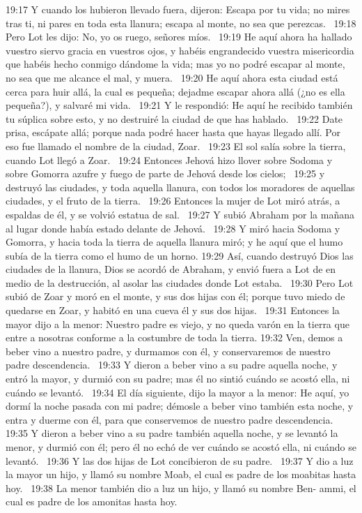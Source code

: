 19:17 Y cuando los hubieron llevado fuera, dijeron: Escapa por tu vida; no mires tras ti, ni pares en toda esta llanura; escapa al monte, no sea que perezcas.  
19:18 Pero Lot les dijo: No, yo os ruego, señores míos.  
19:19 He aquí ahora ha hallado vuestro siervo gracia en vuestros ojos, y habéis engrandecido vuestra misericordia que habéis hecho conmigo dándome la vida; mas yo no podré escapar al monte, no sea que me alcance el mal, y muera.  
19:20 He aquí ahora esta ciudad está cerca para huir allá, la cual es pequeña; dejadme escapar ahora allá (¿no es ella pequeña?), y salvaré mi vida.  
19:21 Y le respondió: He aquí he recibido también tu súplica sobre esto, y no destruiré la ciudad de que has hablado.  
19:22 Date prisa, escápate allá; porque nada podré hacer hasta que hayas llegado allí. Por eso fue llamado el nombre de la ciudad, Zoar.  
19:23 El sol salía sobre la tierra, cuando Lot llegó a Zoar.  
19:24 Entonces Jehová hizo llover sobre Sodoma y sobre Gomorra azufre y fuego de parte de Jehová desde los cielos;  
19:25 y destruyó las ciudades, y toda aquella llanura, con todos los moradores de aquellas ciudades, y el fruto de la tierra.  
19:26 Entonces la mujer de Lot miró atrás, a espaldas de él, y se volvió estatua de sal.  
19:27 Y subió Abraham por la mañana al lugar donde había estado delante de Jehová.  
19:28 Y miró hacia Sodoma y Gomorra, y hacia toda la tierra de aquella llanura miró; y he aquí que el humo subía de la tierra como el humo de un horno. 
19:29 Así, cuando destruyó Dios las ciudades de la llanura, Dios se acordó de Abraham, y envió fuera a Lot de en medio de la destrucción, al asolar las ciudades donde Lot estaba.  
19:30 Pero Lot subió de Zoar y moró en el monte, y sus dos hijas con él; porque tuvo miedo de quedarse en Zoar, y habitó en una cueva él y sus dos hijas.  
19:31 Entonces la mayor dijo a la menor: Nuestro padre es viejo, y no queda varón en la tierra que entre a nosotras conforme a la costumbre de toda la tierra. 
19:32 Ven, demos a beber vino a nuestro padre, y durmamos con él, y conservaremos de nuestro padre descendencia.  
19:33 Y dieron a beber vino a su padre aquella noche, y entró la mayor, y durmió con su padre; mas él no sintió cuándo se acostó ella, ni cuándo se levantó.  
19:34 El día siguiente, dijo la mayor a la menor: He aquí, yo dormí la noche pasada con mi padre; démosle a beber vino también esta noche, y entra y duerme con él, para que conservemos de nuestro padre descendencia.  
19:35 Y dieron a beber vino a su padre también aquella noche, y se levantó la menor, y durmió con él; pero él no echó de ver cuándo se acostó ella, ni cuándo se levantó.  
19:36 Y las dos hijas de Lot concibieron de su padre.  
19:37 Y dio a luz la mayor un hijo, y llamó su nombre Moab, el cual es padre de los moabitas hasta hoy.  
19:38 La menor también dio a luz un hijo, y llamó su nombre Ben- ammi, el cual es padre de los amonitas hasta hoy.  
